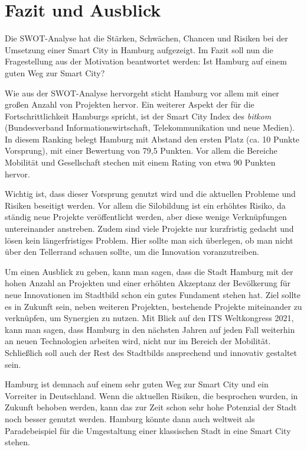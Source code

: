 \section{Fazit und Ausblick}
\label{sec:fazit}

Die SWOT-Analyse hat die Stärken, Schwächen, Chancen und Risiken bei der Umsetzung einer Smart City in Hamburg aufgezeigt. Im Fazit soll nun die Fragestellung aus der Motivation beantwortet werden: Ist Hamburg auf einem guten Weg zur Smart City? 

Wie aus der SWOT-Analyse hervorgeht sticht Hamburg vor allem mit einer großen Anzahl von Projekten hervor. Ein weiterer Aspekt der für die Fortschrittlichkeit Hamburgs spricht, ist der Smart City Index des \textit{bitkom} (Bundesverband Informationswirtschaft, Telekommunikation und neue Medien). In diesem Ranking belegt Hamburg mit Abstand den ersten Platz (ca. 10 Punkte Vorsprung), mit einer Bewertung von 79,5 Punkten. Vor allem die Bereiche Mobilität und Gesellschaft stechen mit einem Rating von etwa 90 Punkten hervor. \autocite[vgl.][]{bitkom.2019}

Wichtig ist, dass dieser Vorsprung genutzt wird und die aktuellen Probleme und Risiken beseitigt werden. Vor allem die Silobildung ist ein erhöhtes Risiko, da ständig neue Projekte veröffentlicht werden, aber diese wenige Verknüpfungen untereinander anstreben. Zudem sind viele Projekte nur kurzfristig gedacht und lösen kein längerfristiges Problem. Hier sollte man sich überlegen, ob man nicht über den Tellerrand schauen sollte, um die Innovation voranzutreiben.

Um einen Ausblick zu geben, kann man sagen, dass die Stadt Hamburg mit der hohen Anzahl an Projekten und einer erhöhten Akzeptanz der Bevölkerung für neue Innovationen im Stadtbild schon ein gutes Fundament stehen hat. Ziel sollte es in Zukunft sein, neben weiteren Projekten, bestehende Projekte miteinander zu verknüpfen, um Synergien zu nutzen. Mit Blick auf den ITS Weltkongress 2021, kann man sagen, dass Hamburg in den nächsten Jahren auf jeden Fall weiterhin an neuen Technologien arbeiten wird, nicht nur im Bereich der Mobilität. Schließlich soll auch der Rest des Stadtbilds ansprechend und innovativ gestaltet sein.

Hamburg ist demnach auf einem sehr guten Weg zur Smart City und ein Vorreiter in Deutschland. Wenn die aktuellen Risiken, die besprochen wurden, in Zukunft behoben werden, kann das zur Zeit schon sehr hohe Potenzial der Stadt noch besser genutzt werden. Hamburg könnte dann auch weltweit als Paradebeispiel für die Umgestaltung einer klassischen Stadt in eine Smart City stehen.



